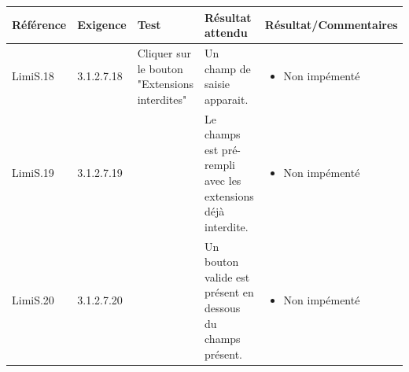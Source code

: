 \documentclass[10pt,a4paper,landscape]{report}
\begin{document}
\newpage
\begin{center}
	\bgroup
	\def\arraystretch{1.5}
	\begin{tabular}{|p{2.5cm}|p{2cm}|p{8cm}|p{8cm}|p{5cm}|}
		\hline
		\rowcolor{gris}Référence & Exigence & Test & Résultat attendu & Résultat/Commentaires\\
		\hline
		LimiS.18 & 3.1.2.7.18 & Cliquer sur le bouton "Extensions interdites" & Un champ de saisie apparait. &\vspace*{-0.2cm} \begin{itemize}[label=$\ast$] \item \textcolor{false}{Non impémenté}\end{itemize}
\\
		\cline{1-2}\cline{4-5}
		LimiS.19 & 3.1.2.7.19 & & Le champs est pré-rempli avec les extensions déjà interdite. &\vspace*{-0.2cm} \begin{itemize}[label=$\ast$] \item \textcolor{false}{Non impémenté}\end{itemize}
\\
		\cline{1-2}\cline{4-5}
		LimiS.20 & 3.1.2.7.20 & & Un bouton valide est présent en dessous du champs présent. &\vspace*{-0.2cm} \begin{itemize}[label=$\ast$] \item \textcolor{false}{Non impémenté}\end{itemize}
\\
		\hline
	\end{tabular}
	\egroup
\end{center}
\end{document}
